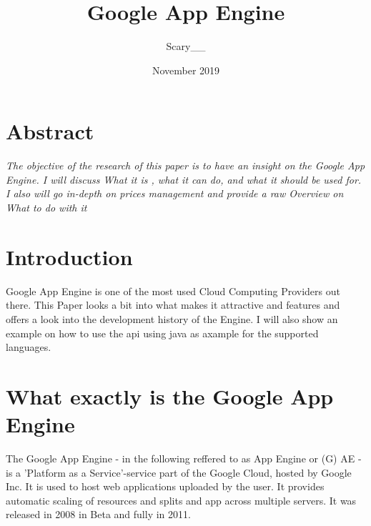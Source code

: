 \documentclass{article}
\title{Google App Engine}
\author{Scary\_\_}
\date{November 2019}
\begin{document}
\maketitle

\section{Abstract}
\textit{The objective of the research of this paper is to have an insight on the Google App Engine. I will discuss What it is , what it can do, and what it should be used for. I also will go in-depth on prices management and provide a raw Overview on What to do with it   }
\section{Introduction}
Google App Engine is one of the most used Cloud Computing Providers out there. This Paper looks a bit into what makes it attractive and features and offers a look into the development history of the Engine. I will also show an example on how to use the api using java as axample for the supported languages.  

\section{What exactly is the Google App Engine}
The Google App Engine - in the following  reffered to as App Engine or (G) AE - is a 'Platform as a Service'-service part of the Google Cloud, hosted by Google Inc. It is used to host web applications uploaded by the user. It provides automatic scaling of resources and splits and app across multiple servers. It was released in 2008 in Beta and fully in 2011. 
\end{document}
